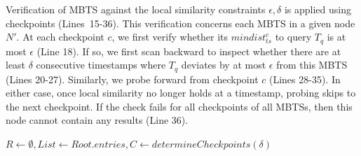 Verification of MBTS against the local similarity constraints $\epsilon, \delta$ is applied using checkpoints (Lines~15-36). This verification concerns each MBTS in a given node $N'$. At each checkpoint $c$, we first verify whether its $mindist_{ts}^c$ to query $T_q$ is at most $\epsilon$ (Line 18). If so, we first scan backward to inspect whether there are at least $\delta$ consecutive timestamps where $T_q$ deviates by at most $\epsilon$ from this MBTS (Lines 20-27). Similarly, we probe forward from checkpoint $c$ (Lines 28-35). In either case, once local similarity no longer holds at a timestamp, probing skips to the next checkpoint. If the check fails for all checkpoints of all MBTSs, then this node cannot contain any results (Line 36).

\SetAlFnt{\small}
\begin{algorithm}[!t]
    \DontPrintSemicolon
    \vspace{4pt}
    $R \leftarrow \emptyset, List \leftarrow Root.entries, C \leftarrow determineCheckpoints(\delta)$ \\
    

\end{algorithm}
